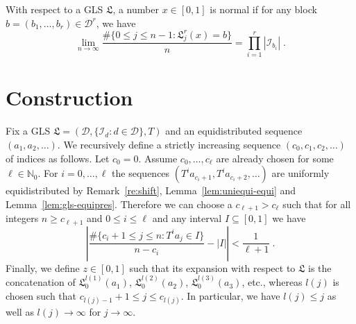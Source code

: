 \documentclass{amsart}
\theoremstyle{definition}
\theoremstyle{remark}
\begin{document}
With respect to a GLS ${\ensuremath{\mathfrak L}}$, a number $x\in[0,1]$ is normal if for any
block $b=(b_1,\dots,b_r)\in{\ensuremath{\mathcal D}}^r$, we have
\begin{equation}
\lim_{n\to\infty}\frac{\#\{0\le j\le n-1:{\ensuremath{\mathfrak L}}_j^r(x)=b\}}n = \prod_{i=1}^r|{\ensuremath{\mathcal I}}_{b_i}| \;. \label{eq:def-normal}
\end{equation}

\section{Construction}\label{sect:constr}
Fix a GLS ${\ensuremath{\mathfrak L}}=({\ensuremath{\mathcal D}},\{{\ensuremath{\mathcal I}}_d:d\in{\ensuremath{\mathcal D}}\},T)$ and an equidistributed sequence
$(a_1,a_2,\dots)$. We recursively define a strictly increasing
sequence $(c_0,c_1,c_2,\dots)$ of indices as follows. Let $c_0=0$.
Assume $c_0,\dots,c_\ell$ are already chosen for some $\ell\in{\ensuremath{\mathbb N}}_0$.
For $i=0,\dots,\ell$ the sequences $(T^ia_{c_i+1},T^ia_{c_i+2},\dots)$ are uniformly equidistributed by Remark~\ref{re:shift},
Lemma~\ref{lem:uniequi-equi} and Lemma~\ref{lem:gls-equipres}. Therefore we can choose a $c_{\ell+1}>c_\ell$ such that for all integers $n\ge c_{\ell+1}$ and $0\le i\le\ell$ and any interval $I\subseteq[0,1]$ we have
\begin{equation}
\left|\frac{\#\{c_i+1\le j\le n:T^ia_j\in I\}}{n-c_i}-|I|\right| < \frac1{\ell+1} \;. \label{eq:c}
\end{equation}
Finally, we define $z\in[0,1]$ such that its expansion with respect to ${\ensuremath{\mathfrak L}}$
is the concatenation of
${\ensuremath{\mathfrak L}}_0^{l(1)}(a_1)$, ${\ensuremath{\mathfrak L}}_0^{l(2)}(a_2)$, ${\ensuremath{\mathfrak L}}_0^{l(3)}(a_3)$, etc., whereas
$l(j)$ is chosen such that $c_{l(j)-1}+1\le j\le c_{l(j)}$.
In particular, we have $l(j)\le j$ as well as $l(j)\to\infty$ for $j\to\infty$.
\end{document}
